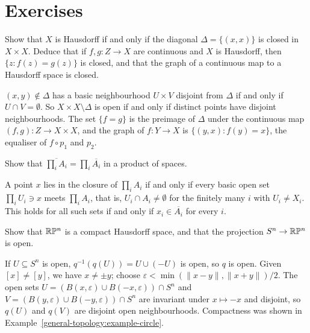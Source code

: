 \section{Exercises}\label{general-topology:section-exercises}

\begin{exercise}\label{general-topology:exercise-hausdorff-diagonal}
Show that $X$ is Hausdorff if and only if the diagonal $\Delta = \{(x, x)\}$ is closed in $X \times X$. Deduce that if $f, g \colon Z \to X$ are continuous and $X$
is Hausdorff, then $\{z : f(z) = g(z)\}$ is closed, and that the graph of a continuous map to a Hausdorff space is closed.
\end{exercise}

\begin{solution}
$(x, y) \notin \Delta$ has a basic neighbourhood $U \times V$ disjoint from $\Delta$ if and only if $U \cap V = \emptyset$. So $X \times X \setminus \Delta$ is open if and
only if distinct points have disjoint neighbourhoods. The set $\{f = g\}$ is the preimage of $\Delta$ under the continuous map $(f, g) \colon Z \to X \times X$, and
the graph of $f \colon Y \to X$ is $\{(y, x) : f(y) = x\}$, the equaliser of $f \circ p_1$ and $p_2$.
\end{solution}

\begin{exercise}\label{general-topology:exercise-closure-product}
Show that $\overline{\prod_i A_i} = \prod_i \overline{A_i}$ in a product of spaces.
\end{exercise}

\begin{solution}
A point $x$ lies in the closure of $\prod_i A_i$ if and only if every basic open set $\prod_i U_i \ni x$ meets $\prod_i A_i$, that is, $U_i \cap A_i \neq \emptyset$
for the finitely many $i$ with $U_i \neq X_i$. This holds for all such sets if and only if $x_i \in \overline{A_i}$ for every $i$.
\end{solution}

\begin{exercise}\label{general-topology:exercise-projective-hausdorff}
Show that $\mathbb{R}\mathbb{P}^n$ is a compact Hausdorff space, and that the projection $S^n \to \mathbb{R}\mathbb{P}^n$ is open.
\end{exercise}

\begin{solution}
If $U \subseteq S^n$ is open, $q^{-1}(q(U)) = U \cup (-U)$ is open, so $q$ is open. Given $[x] \neq [y]$, we have $x \neq \pm y$; choose
$\varepsilon < \min(\|x - y\|, \|x + y\|)/2$. The open sets $U = (B(x, \varepsilon) \cup B(-x, \varepsilon)) \cap S^n$ and
$V = (B(y, \varepsilon) \cup B(-y, \varepsilon)) \cap S^n$ are invariant under $x \mapsto -x$ and disjoint, so $q(U)$ and $q(V)$ are disjoint open
neighbourhoods. Compactness was shown in Example~\ref{general-topology:example-circle}.
\end{solution}

